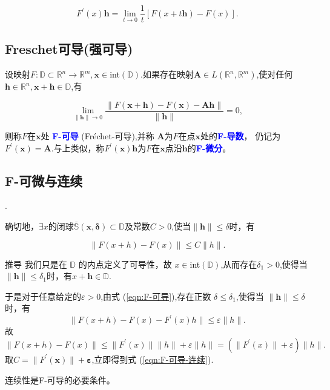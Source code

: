 \documentclass{lzureport}
\begin{document}
$$F^{\prime}(x)\boldsymbol{h}=\lim_{t\to0}\frac1t[F(x+t\boldsymbol{h})-F(x)].$$


\subsection{Freschet可导(强可导)}
设映射$F:\mathbb{D}\subset\mathbb{R}^n\to\mathbb{R}^m,\boldsymbol{x}\in$int$(\mathbb{D}).$如果存在映射$\boldsymbol{A}\in L\left(\mathbb{R}^n,\mathbb{R}^m\right)$,使对任何$\boldsymbol{h}\in\mathbb{R}^n,\boldsymbol{x}+\boldsymbol{h}\in\mathbb{D}$,有

\begin{equation}\label{eqn:F-可导}
\lim_{\|\boldsymbol{h}\|\to0}\frac{\|F(\boldsymbol{x}+\boldsymbol{h})-F(\boldsymbol{x})-\boldsymbol{Ah}\|}{\|\boldsymbol{h}\|}=0,
\end{equation}

则称$F$在$\boldsymbol x$处 \textcolor{blue}{\textbf{F-可导}} (Fréchet-可导),并称 \textcolor{YBXPurple}{$\boldsymbol A$为$F$在点$\boldsymbol x$处的}\textcolor{blue}{\textbf{F-导数}}，
仍记为$F^\prime(\boldsymbol{x})=\boldsymbol{A}.$与上类似，称$F^\prime(\boldsymbol{x})\boldsymbol{h}$为$F$在$\boldsymbol x$点沿$\boldsymbol h$的\textcolor{blue}{\textbf{F-微分}}。

\subsection{F-可微与连续}
\colorbox{yellow}{}.

确切地，$\exists x$的闭球$\overline{\mathbb{S}}(\boldsymbol{x},\boldsymbol{\delta})\subset\mathbb{D}$及常数$C>0$,使当$\|\boldsymbol{h}\|\leqslant\delta$时，有

\begin{equation}
\|F(x+h)-F(x)\|\leqslant C\|h\|.
\end{equation}\label{eqn:F-可导-连续}

\begin{derivation}{推导}
	我们只是在 $\mathbb{D}$ 的内点定义了可导性，故 $x\in$int$(\mathbb{D})$,从而存在$\delta_1>0$,使得当$\|\boldsymbol{h}\|\leqslant\delta_1$时，有$x+\boldsymbol{h}\in\mathbb{D}.$
	
	于是对于任意给定的$\varepsilon>0$,由式 (\ref{eqn:F-可导}),存在正数 $\delta\leqslant\delta_1$,使得当 $\|\boldsymbol{h}\|\leqslant\delta$ 时，有
	$$\|F(x+h)-F(x)-F^{\prime}(x)h\|\leqslant\varepsilon\|h\|.$$
	故
	$$\|F(x+h)-F(x)\|\leqslant\|F^{\prime}(x)\|\|h\|+\varepsilon\|h\|=(\|F^{\prime}(x)\|+\varepsilon)\|h\|.$$
	取$C= \| F^{\prime }( \boldsymbol{x}) \| + \boldsymbol{\varepsilon }$,立即得到式 (\ref{eqn:F-可导-连续}).	

	\textcolor{YBXPurple}{连续性}是F-可导的\textcolor{YBXPurple}{必要条件}。
\end{derivation}
\end{document}
